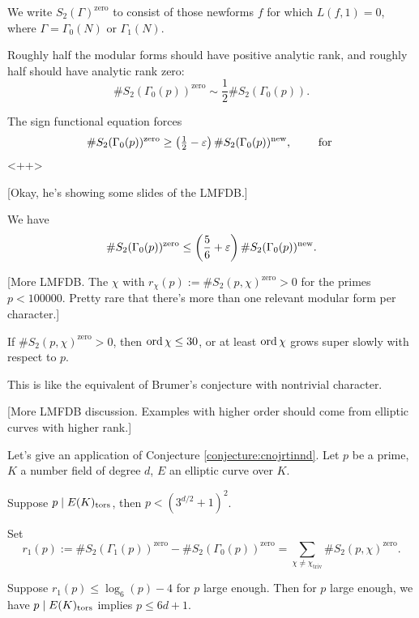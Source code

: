 \documentclass[reqno]{amsart} 
\begin{document}
We write $S_2(\Gamma)^{\mathrm{zero}}$ to consist of those newforms $f$ for which $L(f, 1) = 0$, where $\Gamma = \Gamma_0(N)$ or $\Gamma_1(N)$.

\begin{conjecture}[Brumer]
  Roughly half the modular forms should have positive analytic rank, and roughly half should have analytic rank zero:
  \begin{equation*}
    \# S_2(\Gamma_0(p))^{\mathrm{zero}} \sim \frac{1}{2} \# S_2(\Gamma_0(p)).
  \end{equation*}
\end{conjecture}

The sign functional equation forces
\begin{equation*}
  \# S_2(\Gamma_0(p))^{\mathrm{zero}}
  \geq \left( \tfrac{1}{2} - \varepsilon \right)
  \# S_2(\Gamma_0(p))^{\operatorname{new}},
  \qquad \text{ for }
\end{equation*}<++>


[Okay, he's showing some slides of the LMFDB.]

\begin{theorem}
  We have
  \begin{equation*}
    \# S_2(\Gamma_0(p))^{\mathrm{zero}}
    \leq \left( \frac{5}{6} + \varepsilon \right) \# S_2(\Gamma_0(p))^{\operatorname{new}}.
  \end{equation*}
\end{theorem}

[More LMFDB.  The $\chi$ with $r_\chi(p) := \# S_2(p, \chi)^{\mathrm{zero}} > 0$ for the primes $p < 100000$.  Pretty rare that there's more than one relevant modular form per character.]

\begin{conjecture}[D.,\ Stoll]\label{conjecture:cnojrtinnd}
  If $\# S_2(p, \chi)^{\mathrm{zero}} > 0$, then $\operatorname{ord} \chi \leq 30$, or at least $\operatorname{ord} \chi$ grows super slowly with respect to $p$.
\end{conjecture}
This is like the equivalent of Brumer's conjecture with nontrivial character.

[More LMFDB discussion.  Examples with higher order should come from elliptic curves with higher rank.]

Let's give an application of Conjecture \ref{conjecture:cnojrtinnd}.  Let $p$ be a prime, $K$ a number field of degree $d$, $E$ an elliptic curve over $K$.
\begin{theorem}[Oesterle]
  Suppose $p \mid E(K)_{\operatorname{tors}}$, then $p <(3^{d/2} + 1)^2$.
\end{theorem}
Set
\begin{equation*}
  r_1(p) := \# S_2(\Gamma_1(p))^{\mathrm{zero}}
  -
  \# S_2(\Gamma_0(p))^{\mathrm{zero}}
  =
  \sum_{\chi \neq \chi_{\text{triv}}} \# S_2(p, \chi)^{\mathrm{zero}}.
\end{equation*}
\begin{theorem}[D.\ Stoll]
  Suppose $r_1(p) \leq \log_6(p) - 4$ for $p$ large enough.  Then for $p$ large enough, we have $p \mid E(K)_{\operatorname{tors}}$ implies $p \leq 6 d + 1$.
\end{theorem}
\end{document}

